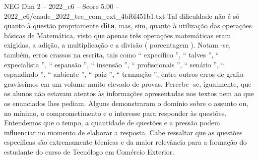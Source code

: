 \begin{textsample}{NEG Dim 2 – 2022\_c6 – Score 5.00 – 2022\_c6/enade\_2022\_tec\_com\_ext\_4bf6f451b1.txt}
Tal dificuldade não é só quanto à questão propriamente \textbf{dita}, mas, sim, quanto à utilização das operações básicas de Matemática, visto que apenas três operações matemáticas eram exigidas, a adição, a multiplicação e a divisão ( porcentagem ).
Notam -se, também, erros crassos na escrita, tais como “ expecífico ”, “ talves ”, “ expecialista ”, “ espansão ”, “ insensão ”, “ profiscionais ”, “ senário ”, “ espandindo ”, “ anbiente ”, “ paiz ”, “ tranzação ”, entre outros erros de grafia gravíssimos em um volume muito elevado de provas.
Percebe -se, igualmente, que os alunos não estavam atentos às informações apresentadas nos textos nem ao que os enunciados lhes pediam.
Alguns demonstraram o domínio sobre o assunto ou, no mínimo, o comprometimento e o interesse para responder às questões.
Entendemos que o tempo, a quantidade de questões e a pressão podem influenciar no momento de elaborar a resposta.
Cabe ressaltar que as questões específicas são extremamente técnicas e da maior relevância para a formação do estudante do curso de Tecnólogo em Comércio Exterior.

\end{textsample}
